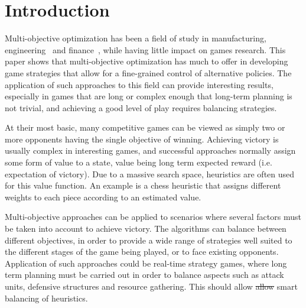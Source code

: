 \documentclass[journal]{IEEEtran}
\providecommand{\DIFdeltex}[1]{{\protect\color{red}\sout{#1}}}                      %
\providecommand{\DIFdelbegin}{} %
\providecommand{\DIFdelend}{} %
\providecommand{\DIFdel}[1]{\texorpdfstring{\DIFdeltex{#1}}{}} %
\begin{document}
%
\IEEEpeerreviewmaketitle


%


\section{Introduction} \label{sec:intro}

Multi-objective optimization has been a field of study in manufacturing, engineering~\cite{Marler2004} and finance~\cite{Coello2006}, while having little impact on games research. This paper shows that multi-objective optimization has much to offer in developing game strategies that allow for a fine-grained control of alternative policies. The application of such approaches to this field can provide interesting results, especially in games that are long or complex enough that long-term planning is not trivial, and achieving a good level of play requires balancing strategies.

At their most basic, many competitive games can be viewed as simply two or more opponents having the single objective of winning. Achieving victory is usually complex in interesting games, and successful approaches normally assign some form of value to a state, value being long term expected reward (i.e. expectation of victory). Due to a massive search space, heuristics are often used for this value function. An example is a chess heuristic that assigns different weights to each piece according to an estimated value.

Multi-objective approaches can be applied to scenarios where several factors must be taken into account to achieve victory. The algorithms can balance between different objectives, in order to provide a wide range of strategies well suited to the different stages of the game being played, or to face existing opponents. Application of such approaches could be real-time strategy games, where long term planning must be carried out in order to balance aspects such as attack units, defensive structures and resource gathering. This should allow \DIFdelbegin \DIFdel{allow }\DIFdelend smart balancing of heuristics. 
\end{document}
